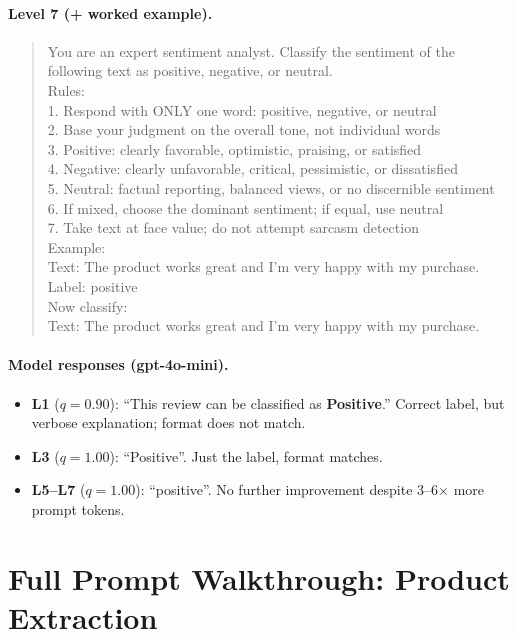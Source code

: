 \paragraph{Level 7 (+ worked example).}
\begin{quote}\small\ttfamily
You are an expert sentiment analyst. Classify the sentiment of the following
text as positive, negative, or neutral.\\[4pt]
Rules:\\
1. Respond with ONLY one word: positive, negative, or neutral\\
2. Base your judgment on the overall tone, not individual words\\
3. Positive: clearly favorable, optimistic, praising, or satisfied\\
4. Negative: clearly unfavorable, critical, pessimistic, or dissatisfied\\
5. Neutral: factual reporting, balanced views, or no discernible sentiment\\
6. If mixed, choose the dominant sentiment; if equal, use neutral\\
7. Take text at face value; do not attempt sarcasm detection\\[4pt]
Example:\\
Text: The product works great and I'm very happy with my purchase.\\
Label: positive\\[4pt]
Now classify:\\
Text: The product works great and I'm very happy with my purchase.
\end{quote}

\paragraph{Model responses (gpt-4o-mini).}
\begin{itemize}
  \item \textbf{L1} ($q=0.90$): ``This review can be classified as
    \textbf{Positive}.'' Correct label, but verbose explanation; format
    does not match.
  \item \textbf{L3} ($q=1.00$): ``Positive''. Just the label, format matches.
  \item \textbf{L5--L7} ($q=1.00$): ``positive''. No further improvement
    despite 3--6$\times$ more prompt tokens.
\end{itemize}

\section{Full Prompt Walkthrough: Product Extraction}
\label{app:pe-walkthrough}

